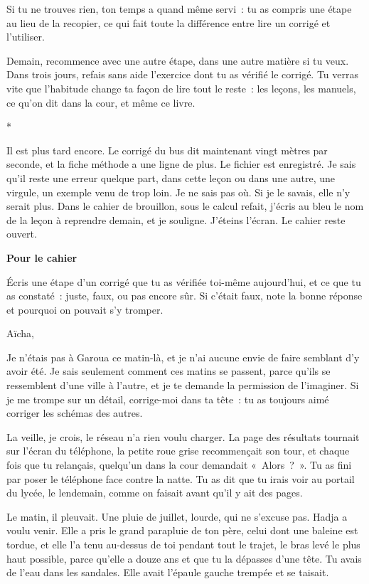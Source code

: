 \documentclass[10.5pt,twoside,openright]{book}
\newcommand{\asterisme}{\par\vspace{0.7em}\centerline{\color{gris}*\quad*\quad*}\vspace{0.7em}\par\noindent}
\newenvironment{pourcahier}[1]{\par\vspace{0.9em}\begin{tcolorbox}[colback=black!4,colframe=accent,boxrule=0pt,leftrule=2.2pt,arc=0pt,left=8pt,right=8pt,top=5pt,bottom=5pt]\small\textbf{#1}\par\smallskip}{\end{tcolorbox}\par}
\newcommand{\chapitre}[2]{\cleardoublepage\markright{#2}\thispagestyle{plain}\vspace*{2.2cm}{\noindent\color{accent}\fontsize{54}{54}\selectfont\bfseries #1}\par\vspace{0.5em}{\noindent\LARGE\bfseries #2\par}\vspace{1.6em}\noindent\ignorespaces}
\begin{document}
Si tu ne trouves rien, ton temps a quand même servi : tu as compris une étape au lieu de la recopier, ce qui fait toute la différence entre lire un corrigé et l’utiliser.

Demain, recommence avec une autre étape, dans une autre matière si tu veux. Dans trois jours, refais sans aide l’exercice dont tu as vérifié le corrigé. Tu verras vite que l’habitude change ta façon de lire tout le reste : les leçons, les manuels, ce qu’on dit dans la cour, et même ce livre.

\asterisme

Il est plus tard encore. Le corrigé du bus dit maintenant vingt mètres par seconde, et la fiche méthode a une ligne de plus. Le fichier est enregistré. Je sais qu’il reste une erreur quelque part, dans cette leçon ou dans une autre, une virgule, un exemple venu de trop loin. Je ne sais pas où. Si je le savais, elle n’y serait plus. Dans le cahier de brouillon, sous le calcul refait, j’écris au bleu le nom de la leçon à reprendre demain, et je souligne. J’éteins l’écran. Le cahier reste ouvert.

\begin{pourcahier}{Pour le cahier}
Écris une étape d’un corrigé que tu as vérifiée toi-même aujourd’hui, et ce que tu as constaté : juste, faux, ou pas encore sûr. Si c’était faux, note la bonne réponse et pourquoi on pouvait s’y tromper.
\end{pourcahier}


\chapitre{15}{Lettre à Aïcha}

Aïcha,

Je n’étais pas à Garoua ce matin-là, et je n’ai aucune envie de faire semblant d’y avoir été. Je sais seulement comment ces matins se passent, parce qu’ils se ressemblent d’une ville à l’autre, et je te demande la permission de l’imaginer. Si je me trompe sur un détail, corrige-moi dans ta tête : tu as toujours aimé corriger les schémas des autres.

La veille, je crois, le réseau n’a rien voulu charger. La page des résultats tournait sur l’écran du téléphone, la petite roue grise recommençait son tour, et chaque fois que tu relançais, quelqu’un dans la cour demandait « Alors ? ». Tu as fini par poser le téléphone face contre la natte. Tu as dit que tu irais voir au portail du lycée, le lendemain, comme on faisait avant qu’il y ait des pages.

Le matin, il pleuvait. Une pluie de juillet, lourde, qui ne s’excuse pas. Hadja a voulu venir. Elle a pris le grand parapluie de ton père, celui dont une baleine est tordue, et elle l’a tenu au-dessus de toi pendant tout le trajet, le bras levé le plus haut possible, parce qu’elle a douze ans et que tu la dépasses d’une tête. Tu avais de l’eau dans les sandales. Elle avait l’épaule gauche trempée et se taisait.
\end{document}
